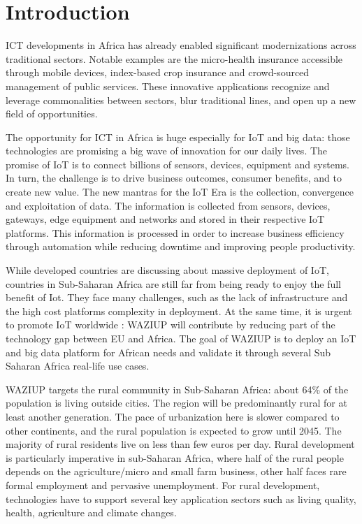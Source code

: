 
\section{Introduction}

ICT developments in Africa has already enabled significant modernizations across traditional sectors.
Notable examples are the micro-health insurance accessible through mobile devices, index-based crop insurance and crowd-sourced management of public services.
These innovative applications recognize and leverage commonalities between sectors, blur traditional lines, and open up a new field of opportunities.

The opportunity for ICT in Africa is huge especially for IoT and big data: those technologies are promising a big wave of innovation for our daily lives.
The promise of IoT is to connect billions of sensors, devices, equipment and systems.
In turn, the challenge is to drive business outcomes, consumer benefits, and to create new value.
The new mantras for the IoT Era is the collection, convergence and exploitation of data.
The information is collected from sensors, devices, gateways, edge equipment and networks and stored in their respective IoT platforms.
This information is processed in order to increase business efficiency through automation while reducing downtime and improving people productivity.

While developed countries are discussing about massive deployment of IoT, countries in Sub-Saharan Africa are still far from being ready to enjoy the full benefit of Iot.
They face many challenges, such as the lack of infrastructure and the high cost platforms complexity in deployment.
At the same time, it is urgent to promote IoT worldwide : WAZIUP will contribute by reducing part of the technology gap between EU and Africa.
The goal of WAZIUP is to deploy an IoT and big data platform for African needs and validate it through several Sub Saharan Africa real-life use cases.

WAZIUP targets the rural community in Sub-Saharan Africa: about 64\% of the population is living outside cities.
The region will be predominantly rural for at least another generation.
The pace of urbanization here is slower compared to other continents, and the rural population is expected to grow until 2045.
The majority of rural residents live on less than few euros per day.
Rural development is particularly imperative in sub-Saharan Africa, where half of the rural people depends on the agriculture/micro and small farm business, other half faces rare formal employment and pervasive unemployment.
For rural development, technologies have to support several key application sectors such as living quality, health, agriculture and climate changes.

